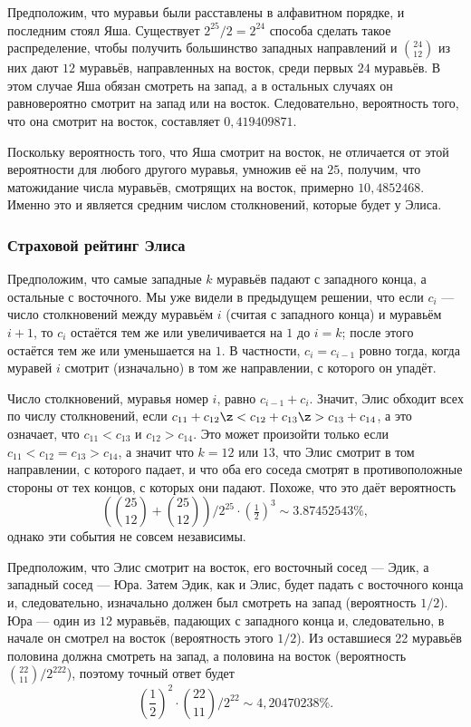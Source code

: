 Предположим, что муравьи были расставлены в алфавитном порядке, и последним стоял Яша.
Существует $2^{25}/2=2^{24}$ способа сделать такое распределение, чтобы получить большинство западных направлений и $\binom{24}{12}$
из них дают $12$ муравьёв, направленных на восток, среди первых $24$ муравьёв.
В этом случае Яша обязан смотреть на запад,
а в остальных случаях он равновероятно смотрит на запад или на восток.
Следовательно, вероятность того, что она смотрит на восток, составляет 
$0{,}419409871$.

Поскольку вероятность того, что Яша смотрит на восток, не отличается от этой вероятности для любого другого муравья, умножив её на $25$, получим, что матожидание числа муравьёв, смотрящих на восток, примерно $10{,}4852468$.
Именно это и является средним числом столкновений, которые будет у Элиса.

\subsubsection*{Страховой рейтинг Элиса}

Предположим, что самые западные $k$ муравьёв падают с западного конца,
а остальные с восточного.
Мы уже видели в предыдущем решении, что если $c_i$ --- число столкновений между муравьём $i$ (считая с западного конца) и муравьём $i + 1$, то $c_i$ остаётся тем же или увеличивается на $1$ до $i = k$; после этого остаётся тем же или уменьшается на $1$.
В частности, $c_i=c_{i-1}$ ровно тогда, когда муравей $i$ смотрит (изначально) в том же направлении, с которого он упадёт.

Число столкновений, муравья номер $i$, равно $c_{i-1}+c_{i}$.
Значит, Элис обходит всех по числу столкновений, если $c_{11}+c_{12}\z<c_{12}+c_{13}\z>c_{13}+c_{14}$, а это означает, что  $c_{11}<c_{13}$ и $c_{12}>c_{14}$.
Это может произойти только если $c_{11}<c_{12}=c_{13}>c_{14}$, а значит что $k = 12$ или $13$, что Элис смотрит в том направлении, с которого падает,
и что оба его соседа смотрят в противоположные стороны от тех концов, с которых они падают.
Похоже, что это даёт вероятность 
\[(\binom{25}{12}+\binom{25}{12})/2^{25}\cdot (\tfrac12)^3\sim 3.87452543\%,\]
однако эти события не совсем независимы.

Предположим, что Элис смотрит на восток, его восточный сосед --- Эдик, а западный сосед --- Юра.
Затем Эдик, как и Элис, будет падать с восточного конца и, следовательно, изначально должен был смотреть на запад (вероятность $1/2$).
Юра --- один из $12$ муравьёв, падающих с западного конца и, следовательно, в начале он смотрел на восток (вероятность этого $1/2$).
Из оставшиеся 22 муравьёв половина должна смотреть на запад, а половина на восток (вероятность $\binom{22}{11}/2^{222}$), поэтому точный ответ будет 
\[\left(\frac12\right)^2\cdot\binom{22}{11}/2^{22}\sim 4{,}20470238\%.\]

